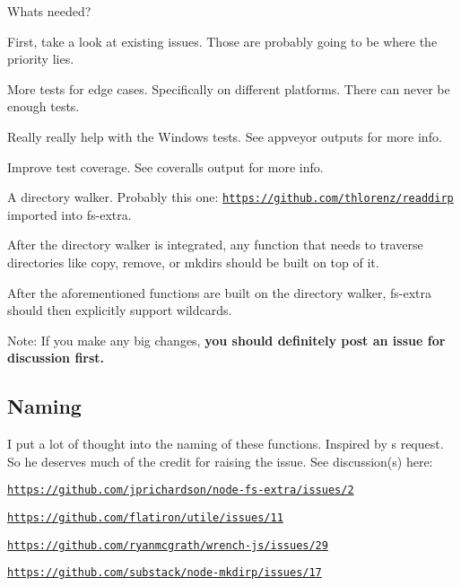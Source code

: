What\textquotesingle{}s needed?
\begin{DoxyItemize}
\item First, take a look at existing issues. Those are probably going to be where the priority lies.
\item More tests for edge cases. Specifically on different platforms. There can never be enough tests.
\item Really really help with the Windows tests. See appveyor outputs for more info.
\item Improve test coverage. See coveralls output for more info.
\item A directory walker. Probably this one\+: \href{https://github.com/thlorenz/readdirp}{\tt https\+://github.\+com/thlorenz/readdirp} imported into {\ttfamily fs-\/extra}.
\item After the directory walker is integrated, any function that needs to traverse directories like {\ttfamily copy}, {\ttfamily remove}, or {\ttfamily mkdirs} should be built on top of it.
\item After the aforementioned functions are built on the directory walker, {\ttfamily fs-\/extra} should then explicitly support wildcards.
\end{DoxyItemize}

Note\+: If you make any big changes, {\bfseries you should definitely post an issue for discussion first.}

\subsection*{Naming }

I put a lot of thought into the naming of these functions. Inspired by \textquotesingle{}s request. So he deserves much of the credit for raising the issue. See discussion(s) here\+:


\begin{DoxyItemize}
\item \href{https://github.com/jprichardson/node-fs-extra/issues/2}{\tt https\+://github.\+com/jprichardson/node-\/fs-\/extra/issues/2}
\item \href{https://github.com/flatiron/utile/issues/11}{\tt https\+://github.\+com/flatiron/utile/issues/11}
\item \href{https://github.com/ryanmcgrath/wrench-js/issues/29}{\tt https\+://github.\+com/ryanmcgrath/wrench-\/js/issues/29}
\item \href{https://github.com/substack/node-mkdirp/issues/17}{\tt https\+://github.\+com/substack/node-\/mkdirp/issues/17}
\end{DoxyItemize}

